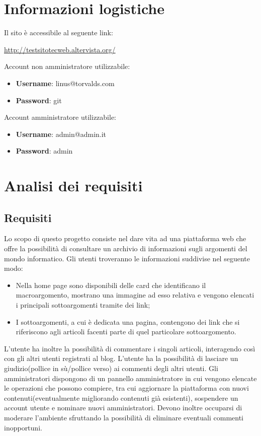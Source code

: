\documentclass[12pt]{article}
\begin{document}
	
	
	\section*{Informazioni logistiche}
	
	Il sito è accessibile al seguente link:
	\begin{center}
		\url{http://testsitotecweb.altervista.org/}
	\end{center}
	
	Account non amministratore utilizzabile:
	\begin{itemize}
		\item \textbf{Username}: linus@torvalds.com
		\item \textbf{Password}: git
	\end{itemize}
	
	Account amministratore utilizzabile:
	\begin{itemize}
		\item \textbf{Username}: admin@admin.it
		\item \textbf{Password}: admin
	\end{itemize}

	\newpage
	
	\tableofcontents
	
	\newpage

	\section{Analisi dei requisiti}
		\subsection{Requisiti}
		Lo scopo di questo progetto consiste nel dare vita ad una piattaforma web che offre la possibilità di consultare un archivio di informazioni sugli argomenti del mondo informatico. Gli utenti troveranno le informazioni suddivise nel seguente modo:
		\begin{itemize}
			\item Nella home page sono disponibili delle card che identificano il macroargomento, mostrano una immagine ad esso relativa e vengono elencati i principali sottoargomenti tramite dei link;
			\item I sottoargomenti, a cui è dedicata una pagina, contengono dei link che si riferiscono agli articoli facenti parte di quel particolare sottoargomento.
		\end{itemize}
		 L'utente ha inoltre la possibilità di commentare i singoli articoli, interagendo così con gli altri utenti registrati al blog. L'utente ha la possibilità di lasciare un giudizio(pollice in sù/pollice verso) ai commenti degli altri utenti. Gli amministratori dispongono di un pannello amministratore in cui vengono elencate le operazioni che possono compiere, tra cui aggiornare la piattaforma con nuovi contenuti(eventualmente migliorando contenuti già esistenti), sospendere un account utente e nominare nuovi amministratori.
		Devono inoltre occuparsi di moderare l'ambiente sfruttando la possibilità di eliminare eventuali commenti inopportuni.
\end{document}
